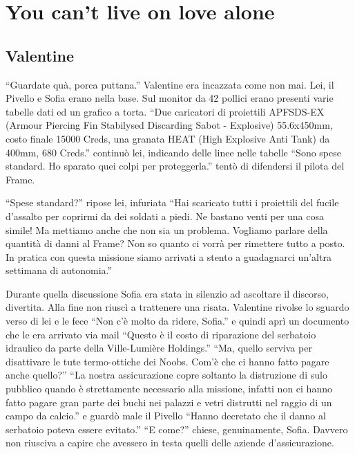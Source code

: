 \chapter{You can't live on love alone}

  \section*{Valentine}

    ``Guardate quà, porca puttana.'' Valentine era incazzata come non mai. Lei, il Pivello e Sofia erano nella base. Sul
    monitor da 42 pollici erano presenti varie tabelle dati ed un grafico a torta. ``Due caricatori di proiettili
    APFSDS-EX (Armour Piercing Fin Stabilysed Discarding Sabot - Explosive) 55.6x450mm, costo finale 15000 Creds, una
    granata HEAT (High Explosive Anti Tank) da 400mm, 680 Creds.'' continuò lei, indicando delle linee nelle tabelle ``Sono
    spese standard. Ho sparato quei colpi per proteggerla.'' tentò di difendersi il pilota del Frame.
    
    ``Spese standard?'' ripose lei, infuriata ``Hai scaricato tutti i proiettili del fucile d'assalto per coprirmi da
    dei soldati a piedi. Ne bastano venti per una cosa simile! Ma mettiamo anche che non sia un problema. Vogliamo
    parlare della quantità di danni al Frame? Non so quanto ci vorrà per rimettere tutto a posto. In pratica con questa
    missione siamo arrivati a stento a guadagnarci un'altra settimana di autonomia.''

    Durante quella discussione Sofia era stata in silenzio ad ascoltare il discorso, divertita. Alla fine non riuscì a
    trattenere una risata. Valentine rivolse lo sguardo verso di lei e le fece ``Non c'è molto da ridere, Sofia.'' e
    quindi aprì un documento che le era arrivato via mail ``Questo è il costo di riparazione del serbatoio idraulico da
    parte della Ville-Lumière Holdings.'' ``Ma, quello serviva per disattivare le tute termo-ottiche dei Noobs. Com'è
    che ci hanno fatto pagare anche quello?'' ``La nostra assicurazione copre soltanto la distruzione di sulo pubblico
    quando è strettamente necessario alla missione, infatti non ci hanno fatto pagare gran parte dei buchi nei palazzi e
    vetri distrutti nel raggio di un campo da calcio.'' e guardò male il Pivello ``Hanno decretato che il danno al
    serbatoio poteva essere evitato.'' ``E come?'' chiese, genuinamente, Sofia. Davvero non riusciva a capire che
    avessero in testa quelli delle aziende d'assicurazione.


